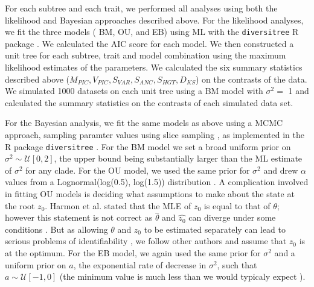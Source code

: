 \documentclass[a4paper,12pt]{article}
\begin{document}
For each subtree and each trait, we performed all analyses using both the likelihood and Bayesian approaches described above. For the likelihood analyses, we fit the three models ( BM, OU, and EB) using ML with the \texttt{diversitree} R package \citep{FitzJohn2012}. We calculated the AIC \citep{Akaike1974} score for each model. We then constructed a unit tree for each subtree, trait and model combination using the maximum likelihood estimates of the parameters. We calculated the six summary statistics described above ($M_{PIC}, V_{PIC}, S_{VAR}, S_{ANC}, S_{HGT}, D_{KS}$) on the contrasts of the data. We simulated 1000 datasets on each unit tree using a BM model with $\sigma^2=$ 1 and calculated the summary statistics on the contrasts of each simulated data set. 

For the Bayesian analysis, we fit the same models as above using a MCMC approach, sampling paramter values using slice sampling \citep{Nealslice}, as implemented in the R package \texttt{diversitree} \citep{FitzJohn2012}. For the BM model we set a broad uniform prior on $\sigma^2 \sim \mathcal{U}[0, 2]$, the upper bound being substantially larger than the ML estimate of $\sigma^2$ for any clade. For the OU model, we used the same prior for $\sigma^2$ and drew $\alpha$ values from a Lognormal(log(0.5), log(1.5)) distribution \citep{UyedaBayou}. A complication involved in fitting OU models is deciding what assumptions to make about the state at the root $z_0$. Harmon et al. \citep{Harmon2010} stated that the MLE of $z_0$ is equal to that of $\theta$; however this statement is not correct as $\hat{\theta}$ and $\hat{z_0}$ can diverge under some conditions \citep{HoAne2012}. But as allowing $\theta$ and $z_0$ to be estimated separately can lead to serious problems of identifiability \citep{HoAne2012}, we follow other authors \citep{ButlerKing2004, Beaulieu2012} and assume that $z_0$ is at the optimum. For the EB model, we again used the same prior for $\sigma^2$ and a uniform prior on $a$, the exponential rate of decrease in $\sigma^2$, such that $a \sim \mathcal{U}[-1, 0]$ (the minimum value is much less than we would typicaly expect \citep{SlaterPennell}).
\end{document}
